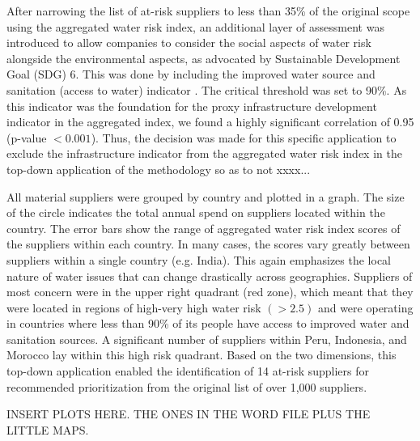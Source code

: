 \documentclass[a4paper]{article}
\begin{document}
After narrowing the list of at-risk suppliers to less than 35\% of the original scope using the aggregated water risk index, an additional layer of assessment was introduced to allow companies to consider the social aspects of water risk alongside the environmental aspects, as advocated by Sustainable Development Goal (SDG) 6.  
This was done by including the improved water source and sanitation (access to water) indicator \citep{WHO:2016}. 
The critical threshold was set to 90\%.  
As this indicator was the foundation for the proxy infrastructure development indicator in the aggregated index, we found a highly significant correlation of 0.95 (p-value $< 0.001$). 
Thus, the decision was made for this specific application to exclude the infrastructure indicator from the aggregated water risk index in the top-down application of the methodology so as to not xxxx...

All material suppliers were grouped by country and plotted in a graph. 
The size of the circle indicates the total annual spend on suppliers located within the country. 
The error bars show the range of aggregated water risk index scores of the suppliers within each country.
 In many cases, the scores vary greatly between suppliers within a single country (e.g. India). 
 This again emphasizes the local nature of water issues that can change drastically across geographies.
 Suppliers of most concern were in the upper right quadrant (red zone), which meant that they were located in regions of high-very high water risk $(>2.5)$ and were operating in countries where less than 90\% of its people have access to improved water and sanitation sources. 
 A significant number of suppliers within Peru, Indonesia, and Morocco lay within this high risk quadrant. 
 Based on the two dimensions, this top-down application enabled the identification of 14 at-risk suppliers for recommended prioritization from the original list of over 1,000 suppliers.

INSERT PLOTS HERE. THE ONES IN THE WORD FILE PLUS THE LITTLE MAPS.
\end{document}
